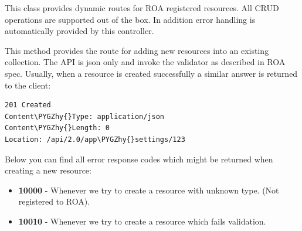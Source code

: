 \documentclass[letterpaper,10pt,english]{sphinxmanual}
\def\PYGZhy{\char`\-}
\begin{document}
\begin{fulllineitems}
\label{features/roa/technical_summary:fantastico.contrib.roa_discovery.roa_controller.RoaController}
This class provides dynamic routes for ROA registered resources. All CRUD operations are supported out of the box. In
addition error handling is automatically provided by this controller.

\begin{fulllineitems}
\label{features/roa/technical_summary:fantastico.contrib.roa_discovery.roa_controller.RoaController.create_item}
This method provides the route for adding new resources into an existing collection. The API is json only and invoke
the validator as described in ROA spec. Usually, when a resource is created successfully a similar answer is returned to
the client:

\begin{Verbatim}[commandchars=\\\{\}]
201 Created
Content\PYGZhy{}Type: application/json
Content\PYGZhy{}Length: 0
Location: /api/2.0/app\PYGZhy{}settings/123
\end{Verbatim}

Below you can find all error response codes which might be returned when creating a new resource:
\begin{itemize}
\item {} 
\textbf{10000} - Whenever we try to create a resource with unknown type. (Not registered to ROA).

\item {} 
\textbf{10010} - Whenever we try to create a resource which fails validation.


\end{itemize}
\end{fulllineitems}
\end{fulllineitems}
\end{document}
